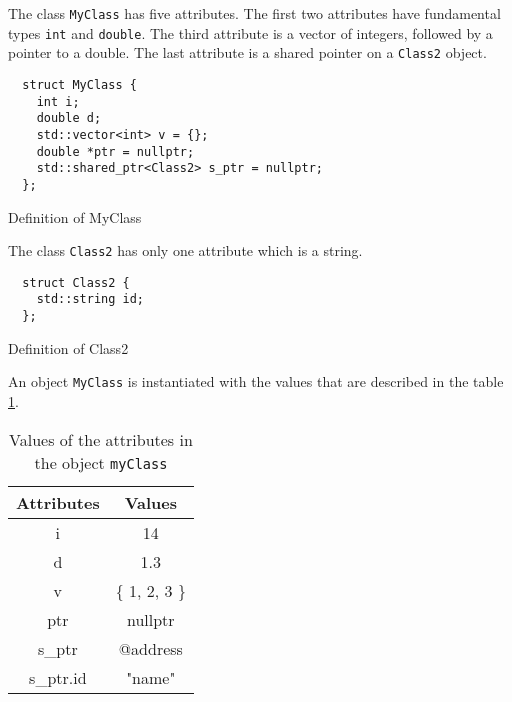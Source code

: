 The class \texttt{MyClass} has five attributes. The first two attributes have
fundamental types \texttt{int} and \texttt{double}. The third attribute is a
vector of integers, followed by a pointer to a double. The last attribute is a
shared pointer on a \texttt{Class2} object.

\begin{listing}[ht!]
\begin{verbatim}
  struct MyClass {
    int i;
    double d;
    std::vector<int> v = {};
    double *ptr = nullptr;
    std::shared_ptr<Class2> s_ptr = nullptr;
  };
\end{verbatim}
\caption{Definition of MyClass}
\label{lst:serexmyclass}
\end{listing}

The class \texttt{Class2} has only one attribute which is a string.

\begin{listing}[ht!]
\begin{verbatim}
  struct Class2 {
    std::string id;
  };
\end{verbatim}
\caption{Definition of Class2}
\label{lst:serexmysecondclass}
\end{listing}

An object \texttt{MyClass} is instantiated with the values that are described in
the table \ref{tbl:serexvals}.

\begin{table}[h!]
\centering
\begin{tabular}{|c|c|}
 \hline
 Attributes & Values \\
 \hline\hline
  i & 14 \\
 \hline
  d & 1.3 \\
 \hline
  v & \{ 1, 2, 3 \} \\
 \hline
  ptr & nullptr \\
 \hline
  s\_ptr & @address \\
 \hline\hline
  s\_ptr.id & "name" \\
 \hline
\end{tabular}
\caption{Values of the attributes in the object \texttt{myClass}}
\label{tbl:serexvals}
\end{table}

